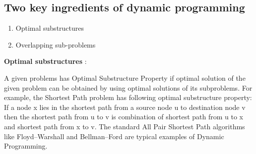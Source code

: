 \documentclass[12pt]{article}
\begin{document}
\subsection{Two key ingredients of dynamic programming}
\begin{enumerate}
\item Optimal substructures
\item Overlapping sub-problems
\end{enumerate}

\textbf{Optimal substructures} :
\par{\indent A given problems has Optimal Substructure Property if optimal solution of the given problem can be obtained by using optimal solutions of its subproblems.
\newline For example, the Shortest Path problem has following optimal substructure property:
\newline If a node x lies in the shortest path from a source node u to destination node v then the shortest path from u to v is combination of shortest path from u to x and shortest path from x to v. The standard All Pair Shortest Path algorithms like Floyd–Warshall and Bellman–Ford are typical examples of Dynamic Programming.}\vspace{2mm}
\end{document}
